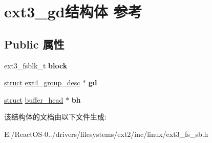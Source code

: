 \hypertarget{structext3__gd}{}\section{ext3\+\_\+gd结构体 参考}
\label{structext3__gd}
\subsection*{Public 属性}
\begin{DoxyCompactItemize}
\item 
\mbox{\label{structext3__gd_a11e64c5002651105d5b670b341f75716}} 
ext3\+\_\+fsblk\+\_\+t {\bfseries block}
\item 
\mbox{\label{structext3__gd_a065b7448910e368bb6385808976e6ef6}} 
\hyperlink{interfacestruct}{struct} \hyperlink{structext4__group__desc}{ext4\+\_\+group\+\_\+desc} $\ast$ {\bfseries gd}
\item 
\mbox{\label{structext3__gd_a800b603905dda92aac9967005d0d01b7}} 
\hyperlink{interfacestruct}{struct} \hyperlink{structbuffer__head}{buffer\+\_\+head} $\ast$ {\bfseries bh}
\end{DoxyCompactItemize}


该结构体的文档由以下文件生成\+:\begin{DoxyCompactItemize}
\item 
E\+:/\+React\+O\+S-\/0../drivers/filesystems/ext2/inc/linux/ext3\+\_\+fs\+\_\+sb.\+h\end{DoxyCompactItemize}
